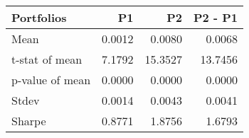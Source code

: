 \begin{tabular}{lrrr}
\toprule
Portfolios & P1 & P2 & P2 - P1 \\
\midrule
Mean & 0.0012 & 0.0080 & 0.0068 \\
t-stat of mean & 7.1792 & 15.3527 & 13.7456 \\
p-value of mean & 0.0000 & 0.0000 & 0.0000 \\
Stdev & 0.0014 & 0.0043 & 0.0041 \\
Sharpe & 0.8771 & 1.8756 & 1.6793 \\
\bottomrule
\end{tabular}
